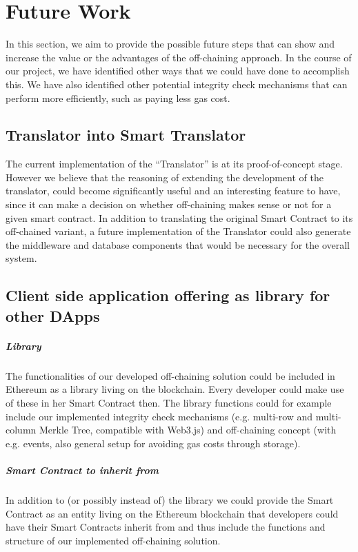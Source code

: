\section{Future Work} \label{sec:future_work}

In this section, we aim to provide the possible future steps that can show and increase the value or the advantages of the off-chaining approach. In the course of our project, we have identified other ways that we could have done to accomplish this. We have also identified other potential integrity check mechanisms that can perform more efficiently, such as paying less gas cost.

\subsection{Translator into Smart Translator}
The current implementation of the “Translator” is at its proof-of-concept stage. However we believe that the reasoning of extending the development of the translator, could become significantly useful and an interesting feature to have, since it can make a decision on whether off-chaining makes sense or not for a given smart contract. In addition to translating the original Smart Contract to its off-chained variant, a future implementation of the Translator could also generate the middleware and database components that would be necessary for the overall system.

\subsection{Client side application offering as library for other DApps}
\subparagraph{Library}
The functionalities of our developed off-chaining solution could be included in Ethereum as a library living on the blockchain. Every developer could make use of these in her Smart Contract then. The library functions could for example include our implemented integrity check mechanisms (e.g. multi-row and multi-column Merkle Tree, compatible with Web3.js) and off-chaining concept (with e.g. events, also general setup for avoiding gas costs through storage).

\subparagraph{Smart Contract to inherit from}
In addition to (or possibly instead of) the library we could provide the Smart Contract as an entity living on the Ethereum blockchain that developers could have their Smart Contracts inherit from and thus include the functions and structure of our implemented off-chaining solution.

